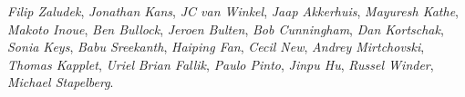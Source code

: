 \emph{Filip Zaludek},
\emph{Jonathan Kans},
\emph{JC van Winkel},
\emph{Jaap Akkerhuis},
\emph{Mayuresh Kathe},
\emph{Makoto Inoue},
\emph{Ben Bullock},
\emph{Jeroen Bulten},
\emph{Bob Cunningham},
\emph{Dan Kortschak},
\emph{Sonia Keys},
\emph{Babu Sreekanth},
\emph{Haiping Fan},
\emph{Cecil New},
\emph{Andrey Mirtchovski},
\emph{Thomas Kapplet},
\emph{Uriel}
\emph{Brian Fallik},
\emph{Paulo Pinto},
\emph{Jinpu Hu},
\emph{Russel Winder},
\emph{Michael Stapelberg}.

